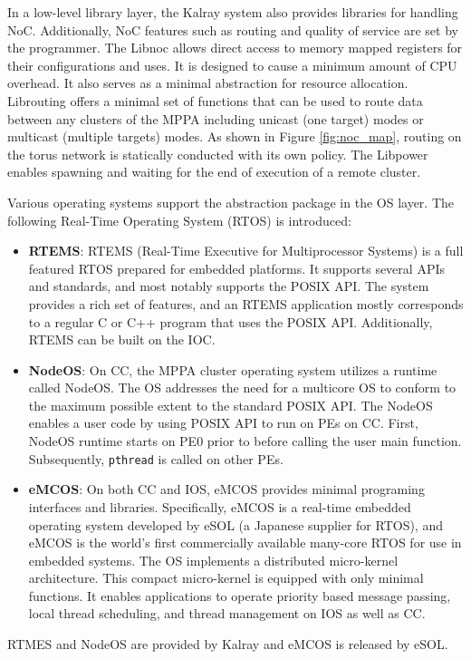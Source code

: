 \documentclass{sig-alternate-05-2015}
\begin{document}
In a low-level library layer, the Kalray system also provides libraries for handling NoC.
Additionally, NoC features such as routing and quality of service are set by the programmer.
The Libnoc allows direct access to memory mapped registers for their configurations and uses.
It is designed to cause a minimum amount of CPU overhead.
It also serves as a minimal abstraction for resource allocation.
Librouting offers a minimal set of functions that can be used to route data between any clusters of the MPPA including unicast (one target) modes or multicast (multiple targets) modes.
As shown in Figure \ref{fig:noc_map}, routing on the torus network is statically conducted with its own policy.
The Libpower enables spawning and waiting for the end of execution of a remote cluster.

Various operating systems support the abstraction package in the OS layer.
The following Real-Time Operating System (RTOS) is introduced:
\begin{itemize}
\item \textbf{RTEMS}: RTEMS (Real-Time Executive for Multiprocessor Systems) is a full featured RTOS prepared for embedded platforms.
It supports several APIs and standards, and most notably supports the POSIX API.
The system provides a rich set of features, and an RTEMS application mostly corresponds to a regular C or C++ program that uses the POSIX API.
Additionally, RTEMS can be built on the IOC.
\item \textbf{NodeOS}: On CC, the MPPA cluster operating system utilizes a runtime called NodeOS.
The OS addresses the need for a multicore OS to conform to the maximum possible extent to the standard POSIX API.
The NodeOS enables a user code by using POSIX API to run on PEs on CC.
First, NodeOS runtime starts on PE0 prior to before calling the user main function.
Subsequently, \texttt{pthread} is called on other PEs.
\item \textbf{eMCOS}: On both CC and IOS, eMCOS provides minimal programing interfaces and libraries.
Specifically, eMCOS is a real-time embedded operating system developed by eSOL (a Japanese supplier for RTOS), and eMCOS is the world's first commercially available many-core RTOS for use in embedded systems.
The OS implements a distributed micro-kernel architecture.
This compact micro-kernel is equipped with only minimal functions.
It enables applications to operate priority based message passing, local thread scheduling, and thread management on IOS as well as CC.
\end{itemize}
RTMES and NodeOS are provided by Kalray and eMCOS is released by eSOL.
\end{document}
